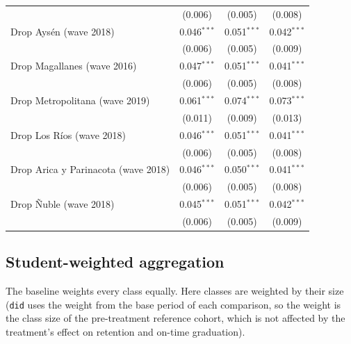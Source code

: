 \documentclass[
]{article}
\begin{document}
\begin{table}[htbp]
{{\begin{tabular}{lccc}
       & (0.006) & (0.005) & (0.008)\\
      Drop Ays\'en (wave 2018) & 0.046$^{***}$ & 0.051$^{***}$ & 0.042$^{***}$\\
       & (0.006) & (0.005) & (0.009)\\
      Drop Magallanes (wave 2016) & 0.047$^{***}$ & 0.051$^{***}$ & 0.041$^{***}$\\
       & (0.006) & (0.005) & (0.008)\\
      Drop Metropolitana (wave 2019) & 0.061$^{***}$ & 0.074$^{***}$ & 0.073$^{***}$\\
       & (0.011) & (0.009) & (0.013)\\
      Drop Los R\'ios (wave 2018) & 0.046$^{***}$ & 0.051$^{***}$ & 0.041$^{***}$\\
       & (0.006) & (0.005) & (0.008)\\
      Drop Arica y Parinacota (wave 2018) & 0.046$^{***}$ & 0.050$^{***}$ & 0.041$^{***}$\\
       & (0.006) & (0.005) & (0.008)\\
      Drop \~Nuble (wave 2018) & 0.045$^{***}$ & 0.051$^{***}$ & 0.042$^{***}$\\
       & (0.006) & (0.005) & (0.009)\\
      \bottomrule
   \end{tabular}}}
\end{table}

\hypertarget{student-weighted-aggregation}{%
\subsection{Student-weighted
aggregation}\label{student-weighted-aggregation}}

The baseline weights every class equally. Here classes are weighted by
their size (\texttt{did} uses the weight from the base period of each
comparison, so the weight is the class size of the pre-treatment
reference cohort, which is not affected by the treatment's effect on
retention and on-time graduation).
\end{document}
